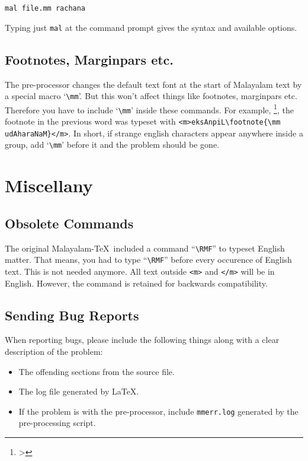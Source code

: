 \documentclass[12pt]{article}
\begin{document}
{\noindent \verb"mal file.mm rachana"

Typing just {\tt mal} at the command prompt gives the syntax
and available options.

\subsection{Footnotes, Marginpars etc.}

The pre-processor changes the default text font
at the start of Malayalam text by a special macro `\verb"\mm"'.
But this won't affect things like footnotes, marginpars etc. 
Therefore you have to include `\verb"\mm"' inside these commands. For example,
{\mm \-\-\-\-\footnote{\mm \-\-\-\-\->}}, the footnote in the
previous word was typeset with
{\tt <m{}>eksAnpiL\verb"\footnote{\mm udAharaNaM}"</m{}>}.
In short, if strange english characters appear anywhere
inside a group, add `\verb"\mm"' before it and the
problem should be gone.

\vfill\eject

\section{Miscellany}

\subsection{Obsolete Commands}

The original Malayalam-\TeX\ included a command ``\verb"\RMF"''
to typeset English matter. That means, you had to type
``\verb"\RMF"'' before every occurence of English text.
This is not needed anymore. All text outside {\tt <m{}>}
and {\tt </m{}>} will be in English. However, the command
is retained for backwards compatibility.

\subsection{Sending Bug Reports}


When reporting bugs, please include the following things
along with a clear description of the problem:

\begin{itemize}
\item The offending sections from the source file.
\item The log file generated by \LaTeX .
\item If the problem is with the pre-processor, include
{\tt mmerr.log} generated by the pre-processing script.
\end{itemize}

}
\end{document}
